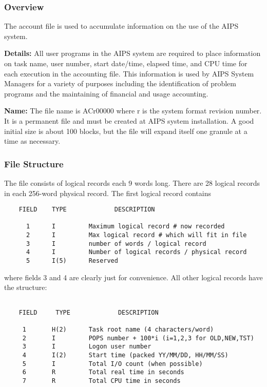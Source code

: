 \subsubsection{Overview}


  The account file is used to accumulate information on the
use of the AIPS system.

{\bf Details:}  All user programs in the AIPS system are required to place
information on task name, user number, start date/time, elapsed time,
and CPU time for each execution in the accounting file.  This
information is used by AIPS System Managers for a variety of purposes
including the identification of problem programs and the maintaining
of financial and usage accounting.

{\bf Name:}  The file name is ACr00000 where r is the system format revision
number.  It is a permanent file and must be
created at AIPS system installation.  A good initial size is about
100 blocks, but the file will expand itself one granule at a time as
necessary.


\subsubsection{File Structure}


     The file consists of logical records each 9 words long.  There are
28 logical records in each 256-word physical record.  The first logical
record contains
\begin{verbatim}
    FIELD    TYPE             DESCRIPTION

      1      I         Maximum logical record # now recorded
      2      I         Max logical record # which will fit in file
      3      I         number of words / logical record
      4      I         Number of logical records / physical record
      5      I(5)      Reserved
\end{verbatim}
where fields 3 and 4 are clearly just for convenience.  All other
logical records have the structure:
\begin{verbatim}

    FIELD     TYPE             DESCRIPTION

     1       H(2)      Task root name (4 characters/word)
     2       I         POPS number + 100*i (i=1,2,3 for OLD,NEW,TST)
     3       I         Logon user number
     4       I(2)      Start time (packed YY/MM/DD, HH/MM/SS)
     5       I         Total I/O count (when possible)
     6       R         Total real time in seconds
     7       R         Total CPU time in seconds
\end{verbatim}

